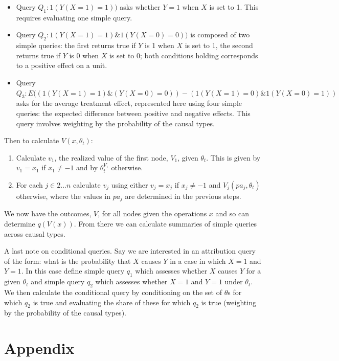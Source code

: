 \documentclass[
  12pt,
]{book}
\providecommand{\tightlist}{%
  \setlength{\itemsep}{0pt}\setlength{\parskip}{0pt}}
\begin{document}
\begin{itemize}
\tightlist
\item
  Query \(Q_1:1(Y(X=1)=1))\) asks whether \(Y=1\) when \(X\) is set to 1. This requires evaluating one simple query.
\item
  Query \(Q_2:1(Y(X=1)=1) \& 1(Y(X=0)=0))\) is composed of two simple queries: the first returns true if \(Y\) is 1 when \(X\) is set to 1, the second returns true if \(Y\) is 0 when \(X\) is set to 0; both conditions holding corresponds to a positive effect on a unit.
\item
  Query \(Q_3:E((1(Y(X=1)=1) \& (Y(X=0)=0)) - (1(Y(X=1)=0) \& 1(Y(X=0)=1))\) asks for the average treatment effect, represented here using four simple queries: the expected difference between positive and negative effects. This query involves weighting by the probability of the causal types.
\end{itemize}

Then to calculate \(V(x, \theta_t)\):

\begin{enumerate}
\def\labelenumi{\arabic{enumi}.}
\tightlist
\item
  Calculate \(v_1\), the realized value of the first node, \(V_1\), given \(\theta_t\). This is given by \(v_1 = x_1\) if \(x_1 \neq -1\) and by \(\theta_t^{V_1}\) otherwise.
\item
  For each \(j \in 2...n\) calculate \(v_j\) using either \(v_j = x_j\) if \(x_j \neq -1\) and \(V_{j}(pa_j, \theta_t)\) otherwise, where the values in \(pa_j\) are determined in the previous steps.
\end{enumerate}

We now have the outcomes, \(V\), for all nodes given the operations \(x\) and so can determine \(q(V(x))\). From there we can calculate summaries of simple queries across causal types.

A last note on conditional queries. Say we are interested in an attribution query of the form: what is the probability that \(X\) causes \(Y\) in a case in which \(X=1\) and \(Y=1\). In this case define simple query \(q_1\) which assesses whether \(X\) causes \(Y\) for a given \(\theta_t\) and simple query \(q_2\) which assesses whether \(X=1\) and \(Y=1\) under \(\theta_t\). We then calculate the conditional query by conditioning on the set of \(\theta\)s for which \(q_2\) is true and evaluating the share of these for which \(q_2\) is true (weighting by the probability of the causal types).

\hypertarget{appendix}{%
\section{Appendix}\label{appendix}}
\end{document}
